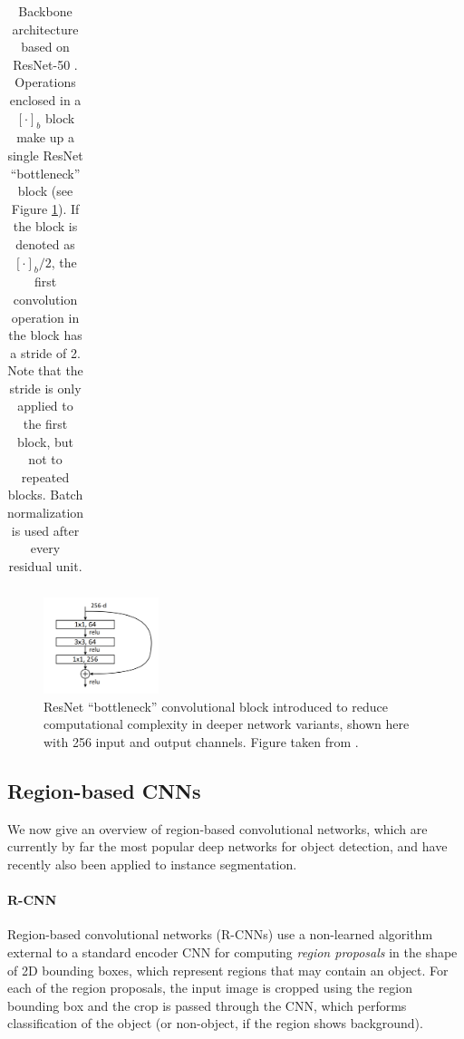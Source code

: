 {\begin{table}[h]
\begin{tabular}{llr}
\bottomrule
\end{tabular}
\caption {
Backbone architecture based on ResNet-50 \cite{ResNet}.
Operations enclosed in a $[\cdot]_b$ block make up a single ResNet \enquote{bottleneck}
block (see Figure \ref{figure:bottleneck}). If the block is denoted as $[\cdot]_b/2$,
the first convolution operation in the block has a stride of 2. Note that the stride
is only applied to the first block, but not to repeated blocks.
Batch normalization \cite{BN} is used after every residual unit.
}
\label{table:resnet}
\end{table}
}

\begin{figure}[t]
  \centering
  \includegraphics[width=0.3\textwidth]{figures/bottleneck}
\caption{
ResNet \cite{ResNet} \enquote{bottleneck} convolutional block introduced to reduce computational
complexity in deeper network variants, shown here with 256 input and output channels.
Figure taken from \cite{ResNet}.
}
\label{figure:bottleneck}
\end{figure}

\subsection{Region-based CNNs}
\label{ssec:rcnn}
We now give an overview of region-based convolutional networks, which are currently by far the
most popular deep networks for object detection, and have recently also been applied to instance segmentation.

\paragraph{R-CNN}
Region-based convolutional networks (R-CNNs) \cite{RCNN} use a non-learned algorithm external to a standard encoder CNN
for computing \emph{region proposals} in the shape of 2D bounding boxes, which represent regions that may contain an object.
For each of the region proposals, the input image is cropped using the region bounding box and the crop is
passed through the CNN, which performs classification of the object (or non-object, if the region shows background).

